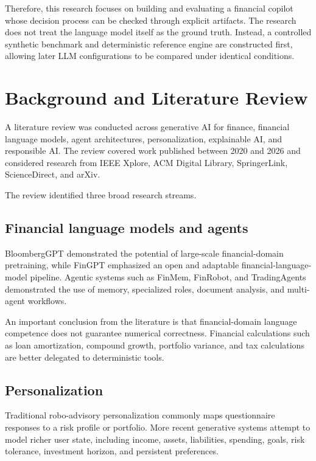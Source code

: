\documentclass[12pt,a4paper]{article}
\begin{document}
Therefore, this research focuses on building and evaluating a financial copilot whose decision process can be checked through explicit artifacts. The research does not treat the language model itself as the ground truth. Instead, a controlled synthetic benchmark and deterministic reference engine are constructed first, allowing later LLM configurations to be compared under identical conditions.

\section{Background and Literature Review}

A literature review was conducted across generative AI for finance, financial language models, agent architectures, personalization, explainable AI, and responsible AI. The review covered work published between 2020 and 2026 and considered research from IEEE Xplore, ACM Digital Library, SpringerLink, ScienceDirect, and arXiv.

The review identified three broad research streams.

\subsection{Financial language models and agents}

BloombergGPT demonstrated the potential of large-scale financial-domain pretraining, while FinGPT emphasized an open and adaptable financial-language-model pipeline. Agentic systems such as FinMem, FinRobot, and TradingAgents demonstrated the use of memory, specialized roles, document analysis, and multi-agent workflows.

An important conclusion from the literature is that financial-domain language competence does not guarantee numerical correctness. Financial calculations such as loan amortization, compound growth, portfolio variance, and tax calculations are better delegated to deterministic tools.

\subsection{Personalization}

Traditional robo-advisory personalization commonly maps questionnaire responses to a risk profile or portfolio. More recent generative systems attempt to model richer user state, including income, assets, liabilities, spending, goals, risk tolerance, investment horizon, and persistent preferences.
\end{document}
